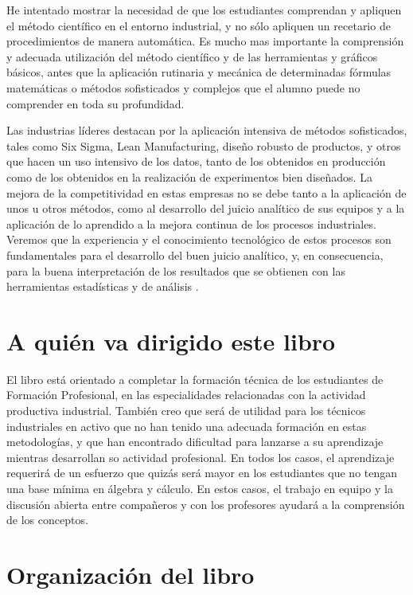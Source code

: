 \documentclass[
  letterpaper,
]{scrbook}
\begin{document}
He intentado mostrar la necesidad de que los estudiantes comprendan y
apliquen el método científico en el entorno industrial, y no sólo
apliquen un recetario de procedimientos de manera automática. Es mucho
mas importante la comprensión y adecuada utilización del método
científico y de las herramientas y gráficos básicos, antes que la
aplicación rutinaria y mecánica de determinadas fórmulas matemáticas o
métodos sofisticados y complejos que el alumno puede no comprender en
toda su profundidad.

Las industrias líderes destacan por la aplicación intensiva de métodos
sofisticados, tales como Six Sigma, Lean Manufacturing, diseño robusto
de productos, y otros que hacen un uso intensivo de los datos, tanto de
los obtenidos en producción como de los obtenidos en la realización de
experimentos bien diseñados. La mejora de la competitividad en estas
empresas no se debe tanto a la aplicación de unos u otros métodos, como
al desarrollo del juicio analítico de sus equipos y a la aplicación de
lo aprendido a la mejora continua de los procesos industriales. Veremos
que la experiencia y el conocimiento tecnológico de estos procesos son
fundamentales para el desarrollo del buen juicio analítico, y, en
consecuencia, para la buena interpretación de los resultados que se
obtienen con las herramientas estadísticas y de análisis .

\hypertarget{a-quiuxe9n-va-dirigido-este-libro}{%
\section*{A quién va dirigido este
libro}\label{a-quiuxe9n-va-dirigido-este-libro}}

El libro está orientado a completar la formación técnica de los
estudiantes de Formación Profesional, en las especialidades relacionadas
con la actividad productiva industrial. También creo que será de
utilidad para los técnicos industriales en activo que no han tenido una
adecuada formación en estas metodologías, y que han encontrado
dificultad para lanzarse a su aprendizaje mientras desarrollan so
actividad profesional. En todos los casos, el aprendizaje requerirá de
un esfuerzo que quizás será mayor en los estudiantes que no tengan una
base mínima en álgebra y cálculo. En estos casos, el trabajo en equipo y
la discusión abierta entre compañeros y con los profesores ayudará a la
comprensión de los conceptos.

\hypertarget{organizaciuxf3n-del-libro}{%
\section*{Organización del libro}\label{organizaciuxf3n-del-libro}}
\end{document}
